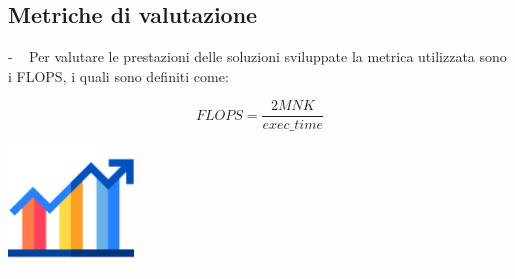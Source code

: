 \documentclass[compress]{beamer}
\begin{document}
\subsection{Metriche di valutazione}
\begin{frame}{\secname \text{ }- \subsecname\ }
    Per valutare le prestazioni delle soluzioni sviluppate la metrica utilizzata sono i FLOPS, i quali sono definiti come:
    \begin{Definition}
        \begin{equation}
            FLOPS = \frac{2MNK}{exec\_time}
        \end{equation}
    \end{Definition}
    \begin{adjustbox}{margin=0cm 0cm 0cm 0.2cm, center} %
        \includegraphics[width=0.25\textwidth]{resources/performance_icon.png}
    \end{adjustbox}
\end{frame}
\end{document}
